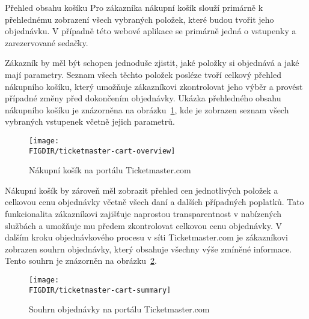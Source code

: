 \begin{subsection}{Přehled obsahu košíku}
    \label{subsec:identifikace-nakupni-kosik-prehled}
    Pro zákazníka nákupní košík slouží primárně k přehlednému zobrazení všech vybraných položek, které budou tvořit jeho objednávku.
    V případně této webové aplikace se primárně jedná o vstupenky a zarezervované sedačky.

    Zákazník by měl být schopen jednoduše zjistit, jaké položky si objednává a jaké mají parametry.
    Seznam všech těchto položek posléze tvoří celkový přehled nákupního košíku, který umožňuje zákazníkovi zkontrolovat jeho výběr a provést případné změny před dokončením objednávky.
    Ukázka přehledného obsahu nákupního košíku je znázorněna na obrázku~\ref{fig:ticketmaster-cart-overview}, kde je zobrazen seznam všech vybraných vstupenek včetně jejich parametrů.

    \begin{figure}[H]
        \centering
        \caption{Nákupní košík na portálu Ticketmaster.com}
        \texttt{[image: \\FIGDIR/ticketmaster-cart-overview]}
        \label{fig:ticketmaster-cart-overview}
    \end{figure}

    Nákupní košík by zároveň měl zobrazit přehled cen jednotlivých položek a celkovou cenu objednávky včetně všech daní a dalších případných poplatků.
    Tato funkcionalita zákazníkovi zajišťuje naprostou transparentnost v nabízených službách a umožňuje mu předem zkontrolovat celkovou cenu objednávky.
    V dalším kroku objednávkového procesu v síti Ticketmaster.com je zákazníkovi zobrazen souhrn objednávky, který obsahuje všechny výše zmíněné informace.
    Tento souhrn je znázorněn na obrázku~\ref{fig:ticketmaster-cart-summary}.

    \begin{figure}[H]
        \centering
        \caption{Souhrn objednávky na portálu Ticketmaster.com}
        \texttt{[image: \\FIGDIR/ticketmaster-cart-summary]}
        \label{fig:ticketmaster-cart-summary}
    \end{figure}
\end{subsection}

